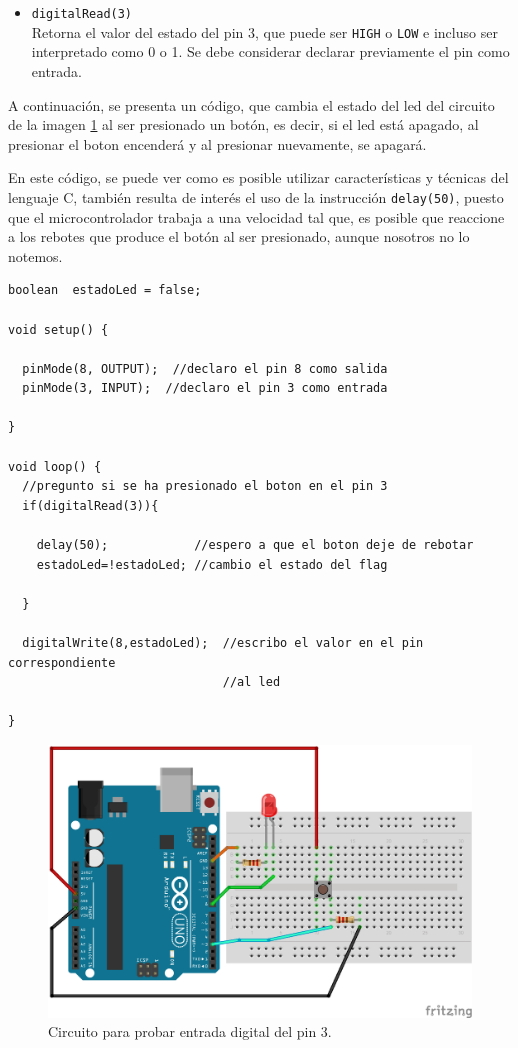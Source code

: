 \documentclass[letterpaper, 10pt]{report}
\begin{document}
\begin{itemize}
\item \texttt{digitalRead(3)}\\
Retorna el valor del estado del pin 3, que puede ser \texttt{HIGH} o \texttt{LOW} e incluso ser interpretado como 0 o 1. Se debe considerar declarar previamente el pin como entrada.
\end{itemize}

A continuación, se presenta un código, que cambia el estado del led del circuito de la imagen \ref{circEntrada} al ser presionado un botón, es decir, si el led está apagado, al presionar el boton encenderá y al presionar nuevamente, se apagará.

En este código, se puede ver como es posible utilizar características y técnicas del lenguaje C, también resulta de interés el uso de la instrucción \texttt{delay(50)}, puesto que el microcontrolador trabaja a una velocidad tal que, es posible que reaccione a los rebotes que produce el botón al ser presionado, aunque nosotros no lo notemos.
\newpage
\begin{lstlisting}[style=myArduino] 
boolean  estadoLed = false;

void setup() {
  
  pinMode(8, OUTPUT);  //declaro el pin 8 como salida
  pinMode(3, INPUT);  //declaro el pin 3 como entrada

}

void loop() {
  //pregunto si se ha presionado el boton en el pin 3
  if(digitalRead(3)){
    
    delay(50);            //espero a que el boton deje de rebotar
    estadoLed=!estadoLed; //cambio el estado del flag
  
  }
  
  digitalWrite(8,estadoLed);  //escribo el valor en el pin correspondiente
                              //al led

}
\end{lstlisting}

\begin{figure}
\centering
\includegraphics[scale=0.7]{botonLed.png}
\caption{Circuito para probar entrada digital del pin 3. \label{circEntrada}}
\end{figure}
 
\end{document}
